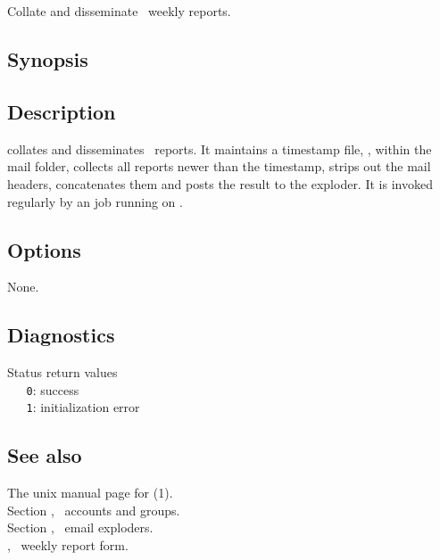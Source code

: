 
\newpage
\section{}
\label{reap}

Collate and disseminate \aipspp\ weekly reports.

\subsection*{Synopsis}
 
\begin{synopsis}
\end{synopsis}
 
\subsection*{Description}
 
 collates and disseminates \aipspp\ reports.  It maintains a
timestamp file, , within the \mbox{} mail
folder, collects all reports newer than the timestamp, strips out the mail
headers, concatenates them and posts the result to the
\mbox{} exploder.  It is invoked regularly by an
  job running on .

\subsection*{Options}
 
None.

\subsection*{Diagnostics}
 
Status return values
\\ \verb+   0+: success
\\ \verb+   1+: initialization error

\subsection*{See also}

The unix manual page for (1).\\
Section , \aipspp\ accounts and groups.\\
Section , \aipspp\ email exploders.\\
, \aipspp\ weekly report form.

